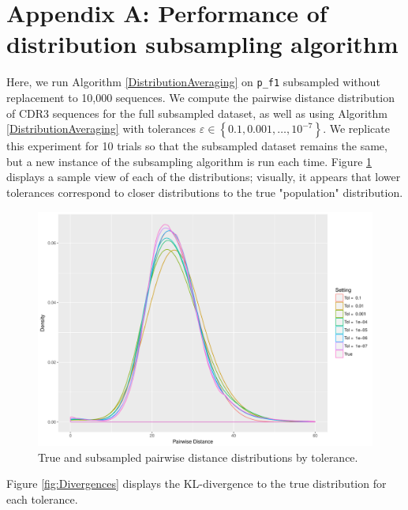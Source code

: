 \documentclass{article}
\begin{document}



\section*{Appendix A: Performance of distribution subsampling algorithm}
Here, we run Algorithm \ref{DistributionAveraging} on \texttt{p\_f1} subsampled without replacement to 10,000 sequences.
We compute the pairwise distance distribution of CDR3 sequences for the full subsampled dataset, as well as using Algorithm \ref{DistributionAveraging} with tolerances $\varepsilon \in \left\{0.1, 0.001, \dotsc, 10^{-7} \right\}$.
We replicate this experiment for 10 trials so that the subsampled dataset remains the same, but a new instance of the subsampling algorithm is run each time.
Figure \ref{fig:Distributions} displays a sample view of each of the distributions; visually, it appears that lower tolerances correspond to closer distributions to the true "population" distribution.
\begin{figure}
    \includegraphics[width=\linewidth]{Figures/dists_by_tol.pdf}
    \caption{True and subsampled pairwise distance distributions by tolerance.}
    \label{fig:Distributions}
\end{figure}
Figure \ref{fig:Divergences} displays the KL-divergence to the true distribution for each tolerance.
\end{document}
